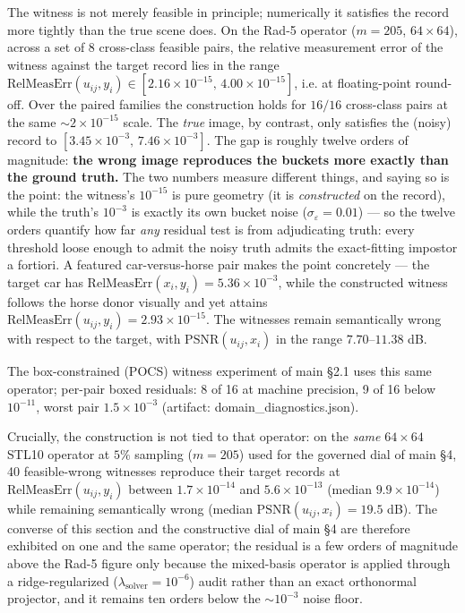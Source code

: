 \documentclass[11pt]{article}
\begin{document}
The witness is not merely feasible in principle; numerically it satisfies the record more tightly than the true scene does. On the Rad-5 operator ($m = 205$, $64\times 64$), across a set of $8$ cross-class feasible pairs, the relative measurement error of the witness against the target record lies in the range $\mathrm{RelMeasErr}(u_{ij}, y_i) \in [2.16\times10^{-15},\, 4.00\times10^{-15}]$, i.e. at floating-point round-off. Over the paired families the construction holds for $16/16$ cross-class pairs at the same $\sim\!2\times10^{-15}$ scale. The \textit{true} image, by contrast, only satisfies the (noisy) record to $[3.45\times10^{-3},\, 7.46\times10^{-3}]$. The gap is roughly twelve orders of magnitude: \textbf{the wrong image reproduces the buckets more exactly than the ground truth.} The two numbers measure different things, and saying so is the point: the witness's $10^{-15}$ is pure geometry (it is \textit{constructed} on the record), while the truth's $10^{-3}$ is exactly its own bucket noise ($\sigma_\varepsilon = 0.01$) --- so the twelve orders quantify how far \textit{any} residual test is from adjudicating truth: every threshold loose enough to admit the noisy truth admits the exact-fitting impostor a fortiori.
A featured car-versus-horse pair makes the point concretely --- the target car has $\mathrm{RelMeasErr}(x_i, y_i) = 5.36\times10^{-3}$, while the constructed witness follows the horse donor visually and yet attains $\mathrm{RelMeasErr}(u_{ij}, y_i) = 2.93\times10^{-15}$. The witnesses remain semantically wrong with respect to the target, with $\mathrm{PSNR}(u_{ij}, x_i)$ in the range $7.70$--$11.38$ dB.

The box-constrained (POCS) witness experiment of main §2.1 uses this same operator; per-pair boxed residuals: 8 of 16 at machine precision, 9 of 16 below $10^{-11}$, worst pair $1.5\times10^{-3}$ (artifact: domain\_diagnostics.json).


Crucially, the construction is not tied to that operator: on the \textit{same} $64\times64$ STL10 operator at $5\%$ sampling ($m=205$) used for the governed dial of main §4, 40 feasible-wrong witnesses reproduce their target records at $\mathrm{RelMeasErr}(u_{ij}, y_i)$ between $1.7\times10^{-14}$ and $5.6\times10^{-13}$ (median $9.9\times10^{-14}$) while remaining semantically wrong (median $\mathrm{PSNR}(u_{ij}, x_i) = 19.5$ dB). The converse of this section and the constructive dial of main §4 are therefore exhibited on one and the same operator; the residual is a few orders of magnitude above the Rad-5 figure only because the mixed-basis operator is applied through a ridge-regularized ($\lambda_{\text{solver}}=10^{-6}$) audit rather than an exact orthonormal projector, and it remains ten orders below the $\sim\!10^{-3}$ noise floor.
\end{document}
